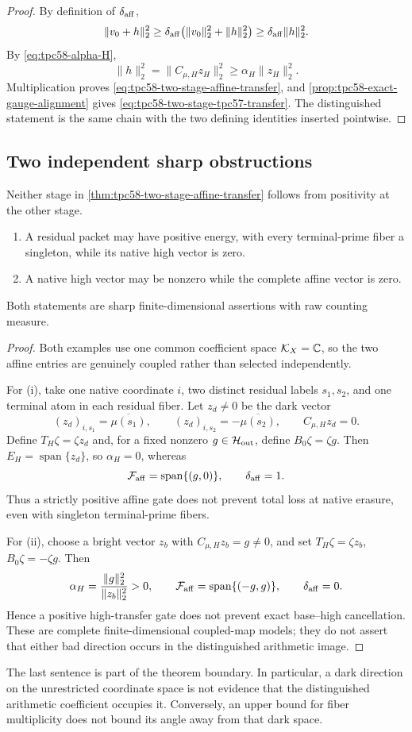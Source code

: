 \begin{proof}
By definition of \(\delta_{\rm aff}\),
\[
 \|v_0+h\|_2^2
 \ge\delta_{\rm aff}
 \bigl(\|v_0\|_2^2+\|h\|_2^2\bigr)
 \ge\delta_{\rm aff}\|h\|_2^2.
\]
By \eqref{eq:tpc58-alpha-H},
\[
 \|h\|_2^2
 =\|C_{\mu,H}z_H\|_2^2
 \ge\alpha_H\|z_H\|_2^2.
\]
Multiplication proves \eqref{eq:tpc58-two-stage-affine-transfer}, and
\cref{prop:tpc58-exact-gauge-alignment} gives
\eqref{eq:tpc58-two-stage-tpc57-transfer}.  The distinguished statement is
the same chain with the two defining identities inserted pointwise.
\end{proof}

\subsection{Two independent sharp obstructions}

\begin{theorem}
\label{thm:tpc58-two-independent-no-go}
Neither stage in \cref{thm:tpc58-two-stage-affine-transfer} follows from
positivity at the other stage.
\begin{enumerate}[label=\textup{(\roman*)},leftmargin=3em]
 \item A residual packet may have positive energy, with every terminal-prime
       fiber a singleton, while its native high vector is zero.
 \item A native high vector may be nonzero while the complete affine vector
       is zero.
\end{enumerate}
Both statements are sharp finite-dimensional assertions with raw counting
measure.
\end{theorem}

\begin{proof}
Both examples use one common coefficient space \(\mathcal K_X=\mathbb C\), so the
two affine entries are genuinely coupled rather than selected independently.

For (i), take one native coordinate \(i\), two distinct residual labels
\(s_1,s_2\), and one terminal atom in each residual fiber.  Let \(z_d\ne0\)
be the dark vector
\[
 (z_d)_{i,s_1}=\overline{\mu(s_1)},
 \qquad
 (z_d)_{i,s_2}=-\overline{\mu(s_2)},
 \qquad C_{\mu,H}z_d=0.
\]
Define \(T_H\zeta=\zeta z_d\) and, for a fixed nonzero
\(g\in\mathcal H_{\rm out}\), define \(B_0\zeta=\zeta g\).  Then
\(E_H=\operatorname{span}\{z_d\}\), so \(\alpha_H=0\), whereas
\[
 \mathcal F_{\rm aff}=\operatorname{span}\{(g,0)\},
 \qquad \delta_{\rm aff}=1.
\]
Thus a strictly positive affine gate does not prevent total loss at native
erasure, even with singleton terminal-prime fibers.

For (ii), choose a bright vector \(z_b\) with
\(C_{\mu,H}z_b=g\ne0\), and set
\(T_H\zeta=\zeta z_b\), \(B_0\zeta=-\zeta g\).  Then
\[
 \alpha_H=\frac{\|g\|_2^2}{\|z_b\|_2^2}>0,
 \qquad
 \mathcal F_{\rm aff}=\operatorname{span}\{(-g,g)\},
 \qquad \delta_{\rm aff}=0.
\]
Hence a positive high-transfer gate does not prevent exact base--high
cancellation.  These are complete finite-dimensional coupled-map models;
they do not assert that either bad direction occurs in the distinguished
arithmetic image.
\end{proof}

The last sentence is part of the theorem boundary.  In particular, a dark
direction on the unrestricted coordinate space is not evidence that the
distinguished arithmetic coefficient occupies it.  Conversely, an upper
bound for fiber multiplicity does not bound its angle away from that dark
space.
